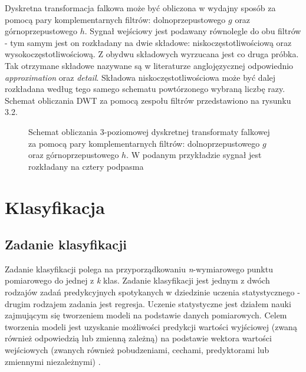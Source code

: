 \documentclass[notitlepage]{report}
\begin{document}
Dyskretna transformacja falkowa może być obliczona w wydajny sposób za pomocą pary komplementarnych filtrów: dolnoprzepustowego $g$ oraz górnoprzepustowego $h$. Sygnał wejściowy jest podawany równolegle do obu filtrów - tym samym jest on rozkładany na dwie składowe: niskoczęstotliwościową oraz wysokoczęstotliwościową. Z obydwu składowych wyrzucana jest co druga próbka. Tak otrzymane składowe nazywane są w literaturze anglojęzycznej odpowiednio \textit{approximation} oraz \textit{detail}. Składowa niskoczęstotliwościowa może być dalej rozkładana według tego samego schematu powtórzonego wybraną liczbę razy. Schemat obliczania DWT za pomocą zespołu filtrów przedstawiono na rysunku 3.2.
\begin{figure}[H]
	\centering
	\caption{Schemat obliczania 3-poziomowej dyskretnej transformaty falkowej za pomocą pary komplementarnych filtrów: dolnoprzepustowego $g$ oraz górnoprzepustowego $h$. W podanym przykładzie sygnał jest rozkładany na cztery podpasma \cite{dwttree}}
\end{figure}
\chapter{Klasyfikacja}
\section{Zadanie klasyfikacji}

Zadanie klasyfikacji polega na przyporządkowaniu \textit{n}-wymiarowego punktu pomiarowego do jednej z \textit{k} klas. Zadanie klasyfikacji jest jednym z dwóch rodzajów zadań predykcyjnych spotykanych w dziedzinie uczenia statystycznego - drugim rodzajem zadania jest regresja. Uczenie statystyczne jest działem nauki zajmującym się tworzeniem modeli na podstawie danych pomiarowych. Celem tworzenia modeli jest uzyskanie możliwości predykcji wartości wyjściowej (zwaną również odpowiedzią lub zmienną zależną) na podstawie wektora wartości wejściowych (zwanych również pobudzeniami, cechami, predyktorami lub zmiennymi niezależnymi) \cite{prml} \cite{islr} \cite{eslii}.
\end{document}
